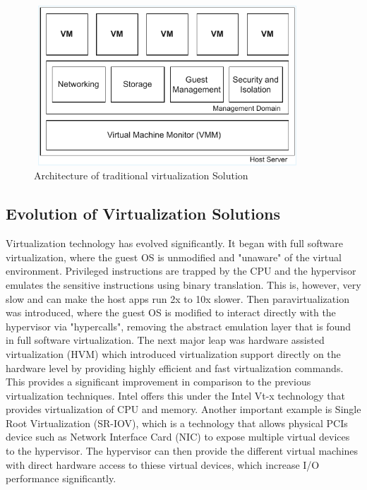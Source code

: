 \begin{figure}[H]
  \centering
  \includegraphics[width=10cm, height=6cm]{figures/hyper.pdf}
  \caption{Architecture of traditional virtualization Solution}
  \label{fig:hyper}
\end{figure}

\subsection{Evolution of Virtualization Solutions}
Virtualization technology has evolved significantly. It began with full software virtualization, where the guest OS is unmodified and "unaware" of the virtual environment. Privileged instructions 
are trapped by the CPU and the hypervisor emulates the sensitive instructions using binary translation. This is, however, very slow and can make the host apps run 2x to 10x slower. Then paravirtualization was introduced, where the guest OS is modified to interact directly with the hypervisor via "hypercalls", removing the abstract emulation layer that is found in full software virtualization. 
The next major leap was hardware assisted virtualization (HVM) which introduced virtualization support directly on the hardware level by providing highly efficient and fast 
virtualization commands. This provides a significant improvement in comparison to the previous virtualization techniques. Intel offers this under the Intel Vt-x technology that provides virtualization of CPU and memory. Another important example is Single Root Virtualization (SR-IOV), which is a technology that allows physical PCIs device such as Network Interface Card (NIC) to expose multiple virtual devices to the hypervisor. The hypervisor can then provide the different virtual machines with direct hardware access to thiese virtual devices, which increase I/O performance significantly. 

